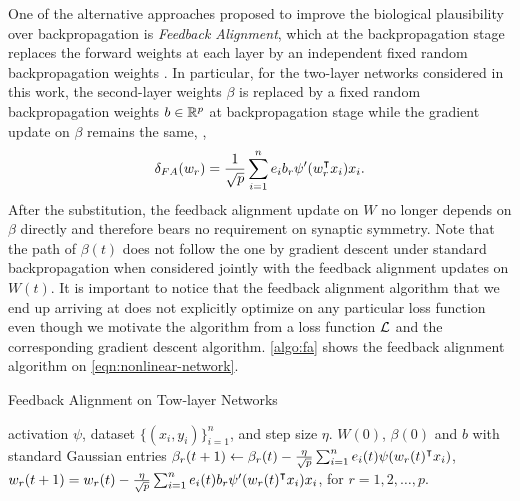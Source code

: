 One of the alternative approaches proposed to improve the biological plausibility over backpropagation is \emph{Feedback Alignment}, which at the backpropagation stage replaces the forward weights at each layer by an independent fixed random backpropagation weights \citep{lillicrap2016random}. In particular, for the two-layer networks considered in this work, the second-layer weights $\beta$ is replaced by a fixed random backpropagation weights $b\in{\mathbb{R}^{p}}$ at backpropagation stage while the gradient update on $\beta$ remains the same, \ie,
\begin{align}\label{eqn:alignment-update}
    \delta_{FA}(w_r) = \frac{1}{\sqrt{p}} \sum_{i=1}^n e_i b_r\psi'(w_r\transpose x_i)x_i.
\end{align}
After the substitution, the feedback alignment update on $W$ no longer depends on $\beta$ directly and therefore bears no requirement on synaptic symmetry. Note that the path of $\beta(t)$ does not follow the one by gradient descent under standard backpropagation when considered jointly with the feedback alignment updates on $W(t)$. It is important to notice that the feedback alignment algorithm that we end up arriving at does not explicitly optimize on any particular loss function even though we motivate the algorithm from a loss function $\mathcal{L}$ and the corresponding gradient descent algorithm.
\cref{algo:fa} shows the feedback alignment algorithm on \eqref{eqn:nonlinear-network}.

\begin{algorithm}[H]
\centering
\caption{Feedback Alignment on Tow-layer Networks}\label{algo:fa}
    \begin{algorithmic}[1]
        \Require activation $\psi$, dataset $\{(x_i,y_i)\}_{i=1}^n$, and step size $\eta$.
         $W(0)$, $\beta(0)$ and $b$ with standard Gaussian entries
            \State $\beta_r(t+1) \gets \beta_r(t) - \frac{\eta}{\sqrt p} \sum_{i=1}^n e_i(t)\psi(w_r(t)\transpose x_i)$,
            \State $w_r(t+1) = w_r(t) - \frac{\eta}{\sqrt{p}} \sum_{i=1}^n e_i(t) b_r\psi'(w_r(t)\transpose x_i)x_i$, for $r=1,2,\ldots,p$.
        \EndWhile
    \end{algorithmic}    
\end{algorithm}%



